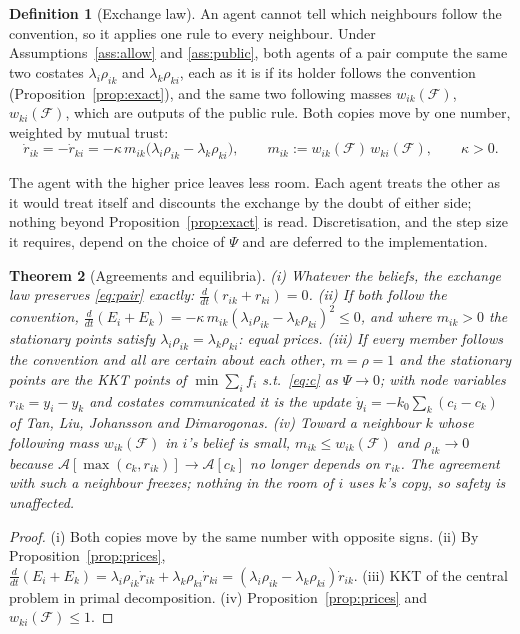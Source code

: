\documentclass[11pt]{article}
\newtheorem{theorem}{Theorem}[section]
\theoremstyle{definition}
\newtheorem{definition}[theorem]{Definition}
\theoremstyle{remark}
\newcommand{\A}{\mathcal{A}}
\newcommand{\F}{\mathcal{F}}
\begin{document}
\begin{definition}[Exchange law]\label{def:exchange}
An agent cannot tell which neighbours follow the convention, so it applies one rule to every neighbour. Under Assumptions~\ref{ass:allow} and \ref{ass:public}, both agents of a pair compute the same two costates $\lambda_i\rho_{ik}$ and $\lambda_k\rho_{ki}$, each as it is if its holder follows the convention (Proposition~\ref{prop:exact}), and the same two following masses $w_{ik}(\F)$, $w_{ki}(\F)$, which are outputs of the public rule. Both copies move by one number, weighted by mutual trust:
\[
\dot r_{ik}=-\dot r_{ki}=-\kappa\,m_{ik}\big(\lambda_i\rho_{ik}-\lambda_k\rho_{ki}\big),\qquad m_{ik}:=w_{ik}(\F)\,w_{ki}(\F),\qquad\kappa>0.
\]
\end{definition}
The agent with the higher price leaves less room. Each agent treats the other as it would treat itself and discounts the exchange by the doubt of either side; nothing beyond Proposition~\ref{prop:exact} is read. Discretisation, and the step size it requires, depend on the choice of $\Psi$ and are deferred to the implementation.

\begin{theorem}[Agreements and equilibria]\label{thm:exchange}
(i) Whatever the beliefs, the exchange law preserves \eqref{eq:pair} exactly: $\frac{d}{dt}(r_{ik}+r_{ki})=0$.
(ii) If both follow the convention, $\frac{d}{dt}(E_i+E_k)=-\kappa\,m_{ik}(\lambda_i\rho_{ik}-\lambda_k\rho_{ki})^2\le0$, and where $m_{ik}>0$ the stationary points satisfy $\lambda_i\rho_{ik}=\lambda_k\rho_{ki}$: equal prices.
(iii) If every member follows the convention and all are certain about each other, $m=\rho=1$ and the stationary points are the KKT points of $\min\sum_if_i$ s.t.\ \eqref{eq:c} as $\Psi\to0$; with node variables $r_{ik}=y_i-y_k$ and costates communicated it is the update $\dot y_i=-k_0\sum_k(c_i-c_k)$ of Tan, Liu, Johansson and Dimarogonas.
(iv) Toward a neighbour $k$ whose following mass $w_{ik}(\F)$ in $i$'s belief is small, $m_{ik}\le w_{ik}(\F)$ and $\rho_{ik}\to0$ because $\A[\max(c_k,r_{ik})]\to\A[c_k]$ no longer depends on $r_{ik}$. The agreement with such a neighbour freezes; nothing in the room of $i$ uses $k$'s copy, so safety is unaffected.
\end{theorem}
\begin{proof}
(i) Both copies move by the same number with opposite signs. (ii) By Proposition~\ref{prop:prices}, $\frac{d}{dt}(E_i+E_k)=\lambda_i\rho_{ik}\dot r_{ik}+\lambda_k\rho_{ki}\dot r_{ki}=(\lambda_i\rho_{ik}-\lambda_k\rho_{ki})\dot r_{ik}$. (iii) KKT of the central problem in primal decomposition. (iv) Proposition~\ref{prop:prices} and $w_{ki}(\F)\le1$.
\end{proof}
\end{document}
